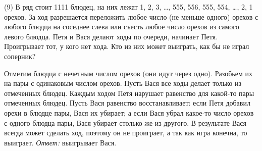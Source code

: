 \textsf{(9)}
В ряд стоит 1111 блюдец, на них лежат
1, 2, 3, \ldots, 555, 556, 555, 554, \ldots, 2, 1 орехов.
За ход разрешается переложить любое число (не меньше одного) орехов с любого
блюдца на соседнее слева или съесть любое число орехов из самого левого блюдца.
Петя и Вася делают ходы по очереди, начинает Петя.
Проигрывает тот, у кого нет хода.
Кто из них может выиграть, как бы не играл соперник?

\solution
Отметим блюдца с нечетным числом орехов (они идут через одно).
Разобьем их на пары с одинаковым числом орехов.
Пусть Вася все ходы делает только из отмеченных блюдец.
Каждым ходом Петя нарушает равенство для какой-то пары отмеченных блюдец.
Пусть Вася равенство восстанавливает:
если Петя добавил орехи в блюдце пары, Вася их убирает;
а если Вася убрал какое-то число орехов с одного блюдца пары, Вася убирает
столько же из другого.
В результате Вася всегда может сделать ход, поэтому он не проиграет,
а так как игра конечна, то выиграет.
\emph{Ответ:} выигрывает Вася.

